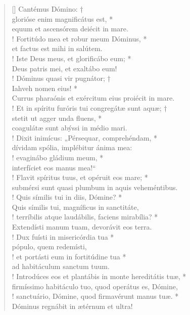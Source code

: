 \begin{verse}[\versewidth]
Cantémus Dómino: †\\
glorióse enim magnificátus est, *\\
equum et ascensórem deiécit in mare.\\!
\vin Fortitúdo mea et robur meum Dóminus, *\\
\vin et factus est mihi in salútem.\\!
Iste Deus meus, et glorificábo eum; *\\
Deus patris mei, et exaltábo eum!\\!
\vin Dóminus quasi vir pugnátor; †\\
\vin Iahveh nomen eius! *\\
\vin Currus pharaónis et exércitum eius proiécit in mare.\\!
Et in spíritu furóris tui congregátæ sunt aquæ; †\\
stetit ut agger unda fluens, *\\
coagulátæ sunt abýssi in médio mari.\\!
\vin Dixit inimícus: „Pérsequar, comprehéndam, *\\
\vin dívidam spólia, implébitur ánima mea:\\!
evaginábo gládium meum, *\\
interfíciet eos manus mea!“\\!
\vin Flavit spíritus tuus, et opéruit eos mare; *\\
\vin submérsi sunt quasi plumbum in aquis veheméntibus.\\!
Quis símilis tui in diis, Dómine? *\\
Quis símilis tui, magníficus in sanctitáte,\\!
\vin terríbilis atque laudábilis, faciens mirabília? *\\
\vin Extendísti manum tuam, devorávit eos terra.\\!
Dux fuísti in misericórdia tua *\\
pópulo, quem redemísti,\\!
\vin et portásti eum in fortitúdine tua *\\
\vin ad habitáculum sanctum tuum.\\!
Introdúces eos et plantábis in monte hereditátis tuæ, *\\
firmíssimo habitáculo tuo, quod operátus es, Dómine,\\!
\vin sanctuário, Dómine, quod firmavérunt manus tuæ. *\\
\vin Dóminus regnábit in ætérnum et ultra!\\
\end{verse}
\vspace{1cm}


